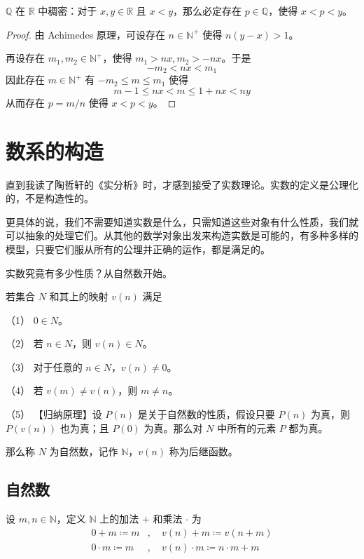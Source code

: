 \begin{example}
	$\mathbb{Q}$ 在 $\mathbb{R}$ 中稠密：对于 $x,y \in \mathbb{R}$ 且 $x<y$，那么必定存在 $p\in\mathbb{Q}$，使得 $x<p<y$。
\end{example}
\begin{proof}
	由 Achimedes 原理，可设存在 $n\in \mathbb{N}^+$ 使得 $n(y-x)>1$。

	再设存在 $m_1,m_2\in \mathbb{N}^+$，使得 $m_1>nx,m_2>-nx$。于是
	\[ -m_2<nx<m_1 \]
	因此存在 $m\in \mathbb{N}^+$ 有 $-m_2\leqslant m \leqslant m_1$ 使得
	\[ m-1\leqslant nx < m \leqslant 1+nx < ny \]
	从而存在 $p=m/n$ 使得 $x<p<y$。
\end{proof}


\section{数系的构造}

直到我读了陶哲轩的《实分析》时，才感到接受了实数理论。实数的定义是公理化的，不是构造性的。

更具体的说，我们不需要知道实数是什么，只需知道这些对象有什么性质，我们就可以抽象的处理它们。从其他的数学对象出发来构造实数是可能的，有多种多样的模型，只要它们服从所有的公理并正确的运作，都是满足的。

实数究竟有多少性质？从自然数开始。

\begin{axiom}[Peano 公理]
	若集合 $N$ 和其上的映射 $v(n)$ 满足

	（1） $0\in N$。

	（2） 若 $n\in N$，则 $v(n) \in N$。

	（3） 对于任意的 $n\in N$，$v(n) \ne 0$。

	（4） 若 $v(m) \ne v(n)$，则 $m\ne n$。

	（5） 【归纳原理】设 $P(n)$ 是关于自然数的性质，假设只要 $P(n)$ 为真，则 $P(v(n))$ 也为真；且 $P(0)$ 为真。那么对 $N$ 中所有的元素 $P$ 都为真。

	那么称 $N$ 为自然数，记作 $\mathbb{N}$，$v(n)$ 称为后继函数。
\end{axiom}

\subsection{自然数}

设 $m,n\in \mathbb{N}$，定义 $\mathbb{N}$ 上的加法 $+$ 和乘法 $\cdot$ 为
\[
	\begin{aligned}
		0+m\coloneqq m      & ,\quad v(n)+m\coloneqq v(n+m)             \\
		0\cdot m\coloneqq m & ,\quad v(n)\cdot m\coloneqq n \cdot m + m
	\end{aligned}
\]

